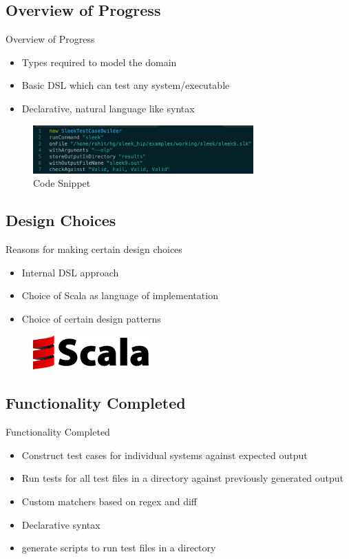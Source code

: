 \documentclass{beamer}
\begin{document}
\subsection{Overview of Progress}
\begin{frame}{Overview of Progress}
\begin{itemize}
\item Types required to model the domain
\item Basic DSL which can test any system/executable
\item Declarative, natural language like syntax
\end{itemize}
\begin{figure}[h!]
  \centering
    \includegraphics[height=70px]{figures/code_snippet.png}
  \caption{Code Snippet}
\end{figure}
\end{frame}

\subsection{Design Choices}
\begin{frame}{Reasons for making certain design choices}
\begin{itemize}
\item Internal DSL approach
\item Choice of Scala as language of implementation
\item Choice of certain design patterns
\end{itemize}
\begin{figure}[h!]
  \centering
    \includegraphics[height=50px]{figures/scala_logo.png}
\end{figure}
\end{frame}

\subsection{Functionality Completed}
\begin{frame}{Functionality Completed}
\begin{itemize}
\item Construct test cases for individual systems against expected output
\item Run tests for all test files in a directory against previously generated output
\item Custom matchers based on regex and diff
\item Declarative syntax
\item generate scripts to run test files in a directory
\end{itemize}
\end{frame}
\end{document}
